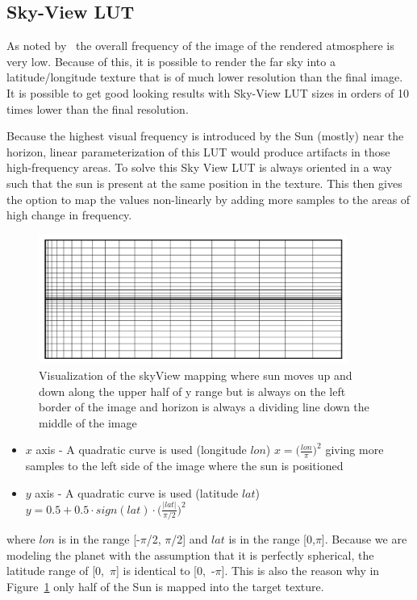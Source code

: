 \documentclass{ctuthesis}
\begin{document}
\subsection{Sky-View LUT}\label{sky view LUT parametrization}
As noted by~\cite{hillaire_2020} the overall frequency of the image of the rendered atmosphere 
is very low. Because of this, it is possible to render the far sky into a latitude/longitude
texture that is of much lower resolution than the final image. It is possible to get good looking
results with Sky-View LUT sizes in orders of 10 times lower than the final resolution.

Because the highest visual frequency is introduced by the Sun (mostly) near the horizon, linear parameterization of this
LUT would produce artifacts in those high-frequency areas. To solve this Sky View LUT is
always oriented in a way such that the sun is present at the same position in the texture.
This then gives the option to map the values non-linearly by adding more samples to the areas of high 
change in frequency.

\begin{figure}
    \centering
    \includegraphics[width=0.9\textwidth]{media/sky_view_mapping.png}
    \caption[Sky View LUT mapping]{Visualization of the skyView mapping where sun moves up and down along the upper half of 
        y range but is always on the left border of the image and horizon is always a dividing line
        down the middle of the image}
    \label{fig:sky_view_mapping}
\end{figure}

\begin{itemize}
    \item $x$ axis - A quadratic curve is used (longitude $lon$) $x = \bigg(\frac{lon}{\pi}\bigg)^{2}$
                     giving more samples to the left side of the image where the sun is positioned
    \item $y$ axis - A quadratic curve is used (latitude $lat$) 
        $y = 0.5 + 0.5 \cdot sign(lat) \cdot \bigg({\frac{|lat|}{\pi / 2}}\bigg)^{2}$
\end{itemize}
where $lon$ is in the range [-$\pi$/2, $\pi$/2] and $lat$ is in the range [0,$\pi$]. Because we are 
modeling the planet with the assumption that it is perfectly spherical, the latitude range of
[0,~$\pi$] is identical to [0,~-$\pi$]. This is also the reason why in Figure~\ref{fig:sky_view_mapping}
only half of the Sun is mapped into the target texture.
\end{document}
